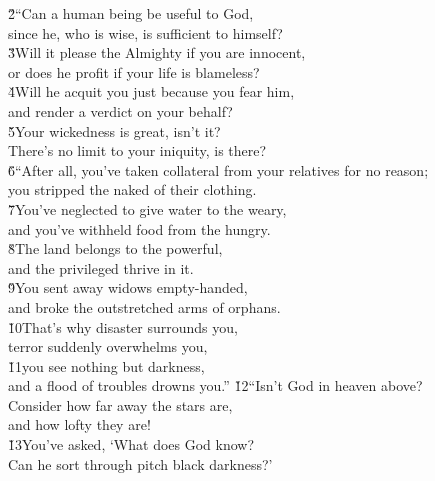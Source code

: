 \begin{poetry}
\poeml \v{2}``Can a human being be useful to God, \\
\poemll    since he, who is wise, is sufficient to himself? \\
\poeml \v{3}Will it please the Almighty if you are innocent, \\
\poemll    or does he profit if your life is blameless? \\
\poeml \v{4}Will he acquit you just because you fear him, \\
\poemll    and render a verdict on your behalf? \\
\poeml \v{5}Your wickedness is great, isn't it? \\
\poemll    There's no limit to your iniquity, is there? \\
\poeml \v{6}``After all, you've taken collateral from your relatives for no reason; \\
\poemll    you stripped the naked of their clothing. \\
\poeml \v{7}You've neglected to give water to the weary, \\
\poemll    and you've withheld food from the hungry. \\
\poeml \v{8}The land belongs to the powerful, \\
\poemll    and the privileged thrive in it. \\
\poeml \v{9}You sent away widows empty-handed, \\
\poemll    and broke the outstretched arms of orphans. \\
\poeml \v{10}That's why disaster surrounds you, \\
\poemll    terror suddenly overwhelms you, \\
\poeml \v{11}you see nothing but darkness, \\
\poemll    and a flood of troubles drowns you.''
\poeml \v{12}``Isn't God in heaven above? \\
\poemll    Consider how far away the stars are, \\
\poemlll       and how lofty they are! \\
\poeml \v{13}You've asked, `What does God know? \\
\poemll    Can he sort through pitch black darkness?' \\

\end{poetry}
